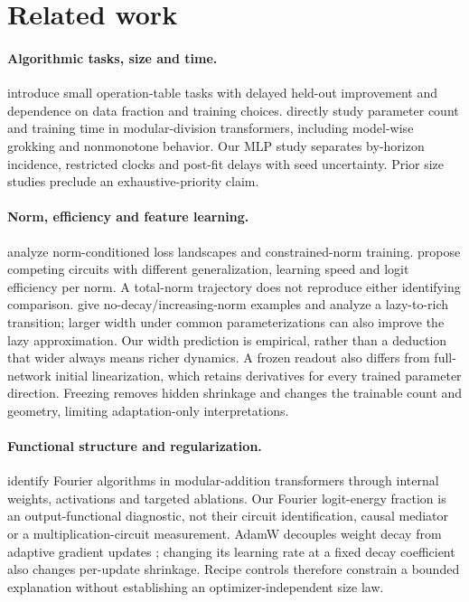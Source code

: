 \section{Related work}
\label{sec:related}
\paragraph{Algorithmic tasks, size and time.}
\citet{power2022grokking} introduce small operation-table tasks with delayed held-out improvement and dependence on data fraction and training choices. \citet{davies2023unifying} directly study parameter count and training time in modular-division transformers, including model-wise grokking and nonmonotone behavior. Our MLP study separates by-horizon incidence, restricted clocks and post-fit delays with seed uncertainty. Prior size studies preclude an exhaustive-priority claim.

\paragraph{Norm, efficiency and feature learning.}
\citet{liu2023omnigrok} analyze norm-conditioned loss landscapes and constrained-norm training. \citet{varma2023efficiency} propose competing circuits with different generalization, learning speed and logit efficiency per norm. A total-norm trajectory does not reproduce either identifying comparison. \citet{kumar2024lazy} give no-decay/increasing-norm examples and analyze a lazy-to-rich transition; larger width under common parameterizations can also improve the lazy approximation. Our width prediction is empirical, rather than a deduction that wider always means richer dynamics. A frozen readout also differs from full-network initial linearization, which retains derivatives for every trained parameter direction. Freezing removes hidden shrinkage and changes the trainable count and geometry, limiting adaptation-only interpretations.

\paragraph{Functional structure and regularization.}
\citet{nanda2023progress} identify Fourier algorithms in modular-addition transformers through internal weights, activations and targeted ablations. Our Fourier logit-energy fraction is an output-functional diagnostic, not their circuit identification, causal mediator or a multiplication-circuit measurement. AdamW decouples weight decay from adaptive gradient updates \citep{loshchilov2019decoupled}; changing its learning rate at a fixed decay coefficient also changes per-update shrinkage. Recipe controls therefore constrain a bounded explanation without establishing an optimizer-independent size law.

